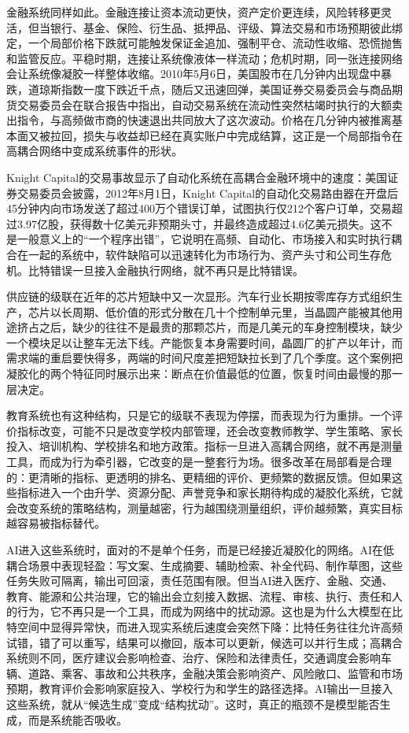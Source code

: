 金融系统同样如此。金融连接让资本流动更快，资产定价更连续，风险转移更灵活，但当银行、基金、保险、衍生品、抵押品、评级、算法交易和市场预期彼此绑定，一个局部价格下跌就可能触发保证金追加、强制平仓、流动性收缩、恐慌抛售和监管反应。平稳时期，连接让系统像液体一样流动；危机时期，同一张连接网络会让系统像凝胶一样整体收缩。2010年5月6日，美国股市在几分钟内出现盘中暴跌，道琼斯指数一度下跌近千点，随后又迅速回弹，美国证券交易委员会与商品期货交易委员会在联合报告中指出，自动交易系统在流动性突然枯竭时执行的大额卖出指令，与高频做市商的快速退出共同放大了这次波动\cite{sec2010findings}。价格在几分钟内被推离基本面又被拉回，损失与收益却已经在真实账户中完成结算，这正是一个局部指令在高耦合网络中变成系统事件的形状。

Knight Capital的交易事故显示了自动化系统在高耦合金融环境中的速度：美国证券交易委员会披露，2012年8月1日，Knight Capital的自动化交易路由器在开盘后45分钟内向市场发送了超过400万个错误订单，试图执行仅212个客户订单，交易超过3.97亿股，获得数十亿美元非预期头寸，并最终造成超过4.6亿美元损失\cite{sec2013knight}。这不是一般意义上的“一个程序出错”，它说明在高频、自动化、市场接入和实时执行耦合在一起的系统中，软件缺陷可以迅速转化为市场行为、资产头寸和公司生存危机。比特错误一旦接入金融执行网络，就不再只是比特错误。

供应链的级联在近年的芯片短缺中又一次显形。汽车行业长期按零库存方式组织生产，芯片以长周期、低价值的形式分散在几十个控制单元里，当晶圆产能被其他用途挤占之后，缺少的往往不是最贵的那颗芯片，而是几美元的车身控制模块，缺少一个模块足以让整车无法下线。产能恢复本身需要时间，晶圆厂的扩产以年计，而需求端的重启要快得多，两端的时间尺度差把短缺拉长到了几个季度。这个案例把凝胶化的两个特征同时展示出来：断点在价值最低的位置，恢复时间由最慢的那一层决定。

教育系统也有这种结构，只是它的级联不表现为停摆，而表现为行为重排。一个评价指标改变，可能不只是改变学校内部管理，还会改变教师教学、学生策略、家长投入、培训机构、学校排名和地方政策。指标一旦进入高耦合网络，就不再是测量工具，而成为行为牵引器，它改变的是一整套行为场。很多改革在局部看是合理的：更清晰的指标、更透明的排名、更精细的评价、更频繁的数据反馈。但如果这些指标进入一个由升学、资源分配、声誉竞争和家长期待构成的凝胶化系统，它就会改变系统的策略结构，测量越密，行为越围绕测量组织，评价越频繁，真实目标越容易被指标替代\cite{goodhart1975problems,campbell1979assessing}。


AI进入这些系统时，面对的不是单个任务，而是已经接近凝胶化的网络。AI在低耦合场景中表现轻盈：写文案、生成摘要、辅助检索、补全代码、制作草图，这些任务失败可隔离，输出可回滚，责任范围有限。但当AI进入医疗、金融、交通、教育、能源和公共治理，它的输出会立刻接入数据、流程、审核、执行、责任和人的行为，它不再只是一个工具，而成为网络中的扰动源。这也是为什么大模型在比特空间中显得异常快，而进入现实系统后速度会突然下降：比特任务往往允许高频试错，错了可以重写，结果可以撤回，版本可以更新，候选可以并行生成；高耦合系统则不同，医疗建议会影响检查、治疗、保险和法律责任，交通调度会影响车辆、道路、乘客、事故和公共秩序，金融决策会影响资产、风险敞口、监管和市场预期，教育评价会影响家庭投入、学校行为和学生的路径选择。AI输出一旦接入这些系统，就从“候选生成”变成“结构扰动”。这时，真正的瓶颈不是模型能否生成，而是系统能否吸收。

